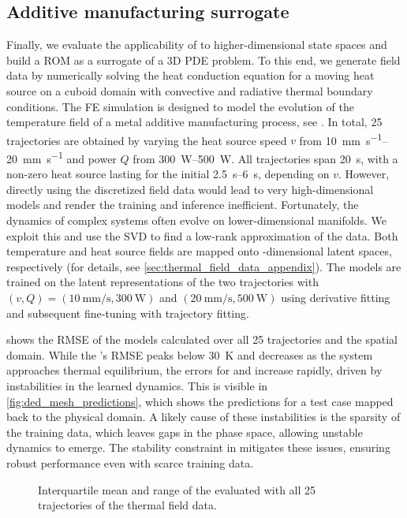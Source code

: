 \subsection{Additive manufacturing surrogate}\label{sec:thermal_field_data}

Finally, we evaluate the applicability of \sPHNNs to higher-dimensional state spaces and build a \gls{ROM} as a  surrogate of a 3D \gls{PDE} problem. 
To this end, we generate field data by numerically solving the heat conduction equation for a moving heat source on a cuboid domain with convective and radiative thermal boundary conditions. 
The \gls{FE} simulation is designed to model the evolution of the temperature field of a metal additive manufacturing process, see 
\cite{kannapinn2024a}.
In total, \num{25} trajectories are obtained by varying the heat source speed $v$ from \qtyrange{10}{20}{\milli\metre\per\second} and power $Q$ from \qtyrange{300}{500}{\watt}.
All trajectories span \qty{20}{\second}, with a non-zero heat source lasting for the initial \qtyrange{2.5}{6}{\second}, depending on $v$.
However, directly using the discretized field data would lead to very high-dimensional models and render the training and inference inefficient. Fortunately, the dynamics of complex systems often evolve on lower-dimensional manifolds. 
We exploit this and use the \gls{SVD} to find a low-rank approximation of the data.
Both temperature and heat source fields are mapped onto \numsvdmodes-dimensional latent spaces, respectively (for details, see \cref{sec:thermal_field_data_appendix}).
The models are trained on the latent representations of the two trajectories with 
$(v,Q)=(\qty{10}{\milli\metre\per\second}, \qty{300}{\watt})$ and $(\qty{20}{\milli\metre\per\second}, \qty{500}{\watt})$
using derivative fitting and subsequent fine-tuning with trajectory fitting.

 shows the \gls{RMSE} of the models calculated over all \num{25} trajectories and the spatial domain. 
While the \sPHNN's \gls{RMSE} peaks below \qty{30}{\kelvin} and decreases as the system approaches thermal equilibrium, the errors for \NODE and \PHNN increase rapidly, driven by instabilities in the learned dynamics. 
This is visible in \cref{fig:ded_mesh_predictions}, which shows the predictions for a test case mapped back to the physical domain.
A likely cause of these instabilities is the sparsity of the training data, which leaves gaps in the phase space, allowing unstable dynamics to emerge. 
The stability constraint in \sPHNNs mitigates these issues, ensuring robust performance even with scarce training data.

\begin{figure}[t]
    \centering
        \caption{Interquartile mean and range of the  evaluated with all \num{25} trajectories of the thermal field data.}
    \label{fig:ded_mesh_rmses_over_time}
    \vskip -0.6cm
\end{figure}

\vspace*{-2mm}

